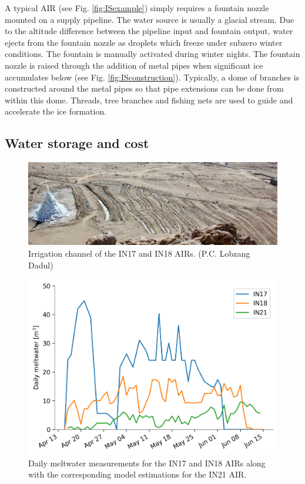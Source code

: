 A typical AIR (see Fig. \ref{fig:ISexample}) simply requires a fountain nozzle mounted on a supply pipeline. The
water source is usually a glacial stream. Due to the altitude difference between the pipeline input and fountain
output, water ejects from the fountain nozzle as droplets which freeze under subzero winter conditions. The
fountain is manually activated during winter nights. The fountain nozzle is raised through the addition of metal
pipes when significant ice accumulates below (see Fig. \ref{fig:ISconstruction}).  Typically, a dome of branches
is constructed around the metal pipes so that pipe extensions can be done from within this dome. Threads, tree
branches and fishing nets are used to guide and accelerate the ice formation.

\subsection{Water storage and cost}

\begin{figure}[htb]
\centering
\includegraphics[width=12cm]{figs/IS_irrigation.jpeg}

\caption{Irrigation channel of the IN17 and IN18 AIRs. (P.C. Lobzang Dadul) }

\label{fig:ISirrigation}
\end{figure}

\begin{figure}[htb]
\centering
\includegraphics[width=12cm]{figs/melt.png}

\caption{Daily meltwater measurements for the IN17 and IN18 AIRs along with the corresponding model estimations
for the IN21 AIR. }

\label{fig:ISmelt}
\end{figure}


